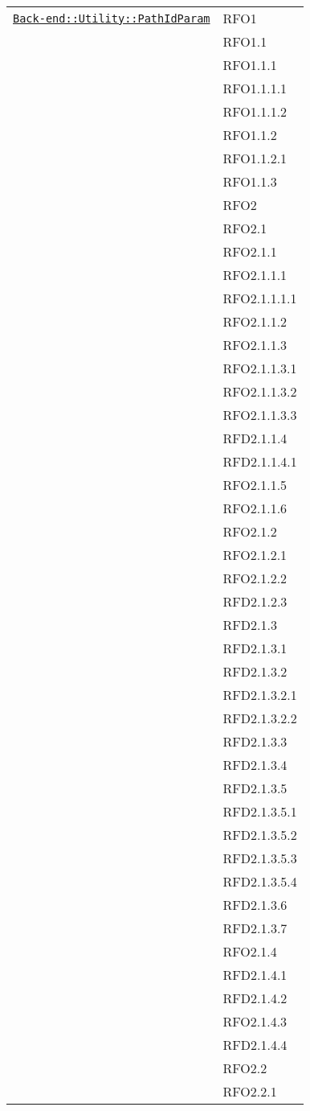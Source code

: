 \begin{longtable}{|>{\centering}m{10cm}|m{3cm}<{\centering}|}
\hyperref[Back-end::Utility::PathIdParam]{\texttt{Back-end::Utility::PathIdParam}} & RFO1\\
& RFO1.1\\
& RFO1.1.1\\
& RFO1.1.1.1\\
& RFO1.1.1.2\\
& RFO1.1.2\\
& RFO1.1.2.1\\
& RFO1.1.3\\
& RFO2\\
& RFO2.1\\
& RFO2.1.1\\
& RFO2.1.1.1\\
& RFO2.1.1.1.1\\
& RFO2.1.1.2\\
& RFO2.1.1.3\\
& RFO2.1.1.3.1\\
& RFO2.1.1.3.2\\
& RFO2.1.1.3.3\\
& RFD2.1.1.4\\
& RFD2.1.1.4.1\\
& RFO2.1.1.5\\
& RFO2.1.1.6\\
& RFO2.1.2\\
& RFO2.1.2.1\\
& RFO2.1.2.2\\
& RFD2.1.2.3\\
& RFD2.1.3\\
& RFD2.1.3.1\\
& RFD2.1.3.2\\
& RFD2.1.3.2.1\\
& RFD2.1.3.2.2\\
& RFD2.1.3.3\\
& RFD2.1.3.4\\
& RFD2.1.3.5\\
& RFD2.1.3.5.1\\
& RFD2.1.3.5.2\\
& RFD2.1.3.5.3\\
& RFD2.1.3.5.4\\
& RFD2.1.3.6\\
& RFD2.1.3.7\\
& RFO2.1.4\\
& RFD2.1.4.1\\
& RFD2.1.4.2\\
& RFO2.1.4.3\\
& RFD2.1.4.4\\
& RFO2.2\\
& RFO2.2.1\\

\end{longtable}
